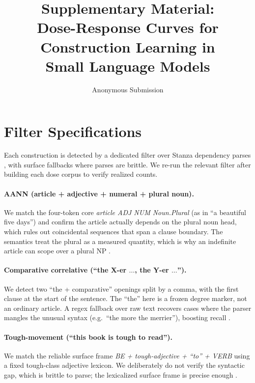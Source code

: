 \documentclass[11pt]{article}
\title{Supplementary Material:\\
  Dose-Response Curves for Construction Learning in\\
  Small Language Models}
\author{Anonymous Submission}
\begin{document}
\maketitle
\appendix

\section{Filter Specifications}
\label{app:filters}
Each construction is detected by a dedicated filter over Stanza dependency
parses \citep{qi2020stanza}, with surface fallbacks where parses are
brittle. We re-run the relevant filter after building each dose corpus to
verify realized counts.

\paragraph{AANN (article + adjective + numeral + plural noun).}
We match the four-token core \emph{article ADJ NUM Noun.Plural} (as in
``a beautiful five days'') and confirm the article actually depends on the
plural noun head, which rules out coincidental sequences that span a clause
boundary. The semantics treat the plural as a measured quantity, which is
why an indefinite article can scope over a plural NP
\citep{mahowald2023aann}.

\paragraph{Comparative correlative (``the X-er $\ldots$, the Y-er $\ldots$'').}
We detect two ``the + comparative'' openings split by a comma, with the
first clause at the start of the sentence. The ``the'' here is a frozen
degree marker, not an ordinary article. A regex fallback over raw text
recovers cases where the parser mangles the unusual syntax (e.g.\ ``the
more the merrier''), boosting recall \citep{weissweiler2022comparative}.

\paragraph{Tough-movement (``this book is tough to read'').}
We match the reliable surface frame \emph{BE + tough-adjective + ``to'' +
VERB} using a fixed tough-class adjective lexicon. We deliberately do not
verify the syntactic gap, which is brittle to parse; the lexicalized
surface frame is precise enough \citep{hu2020syntaxgym}.
\end{document}
